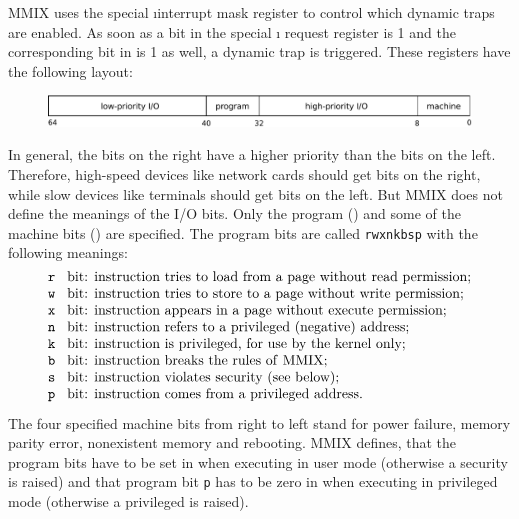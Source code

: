 MMIX uses the special \i{interrupt mask register}  to control which dynamic traps are enabled. As soon as a bit in the special \i{ request register}  is 1 and the corresponding bit in  is 1 as well, a dynamic trap is triggered. These registers have the following layout:
\begin{figure}[H]
	\centering
	\includegraphics[width=\textwidth]{img/rKrQ-crop.pdf}
\end{figure}
\vspace{-20pt}
\noindent In general, the bits on the right have a higher priority than the bits on the left. Therefore, high-speed devices like network cards should get bits on the right, while slow devices like terminals should get bits on the left. But MMIX does not define the meanings of the I/O bits. Only the program () and some of the machine bits () are specified. The program bits are called {\tt rwxnkbsp} with the following meanings:
$$\vbox{\halign{{\tt #} bit: &#\hfil\cr
r	&	instruction tries to load from a page without read permission;\cr
w	&	instruction tries to store to a page without write permission;\cr
x	&	instruction appears in a page without execute permission;\cr
n	&	instruction refers to a privileged (negative) address;\cr
k	&	instruction is privileged, for use by the kernel only;\cr
b	&	instruction breaks the rules of\/ MMIX;\cr
s	&	instruction violates security (see below);\cr
p	&	instruction comes from a privileged address.\cr}}$$
The four specified machine bits from right to left stand for power failure, memory parity error, nonexistent memory and rebooting. MMIX defines, that the program bits have to be set in  when executing in user mode (otherwise a security  is raised) and that program bit {\tt p} has to be zero in  when executing in privileged mode (otherwise a privileged  is raised). \citep[pg. 29]{mmix-doc}


